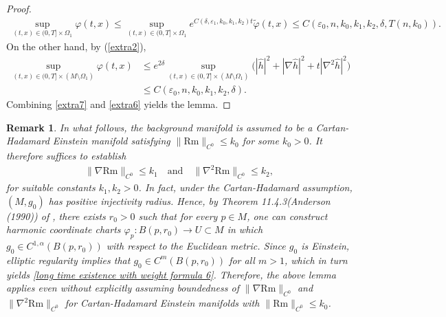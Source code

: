 \documentclass[12pt]{amsart}
\newtheorem{remark}{Remark}[section]
\begin{document}
\begin{proof}
\begin{align}\label{extra7}
    \sup_{(t, x)\in (0, T]\times \Omega_1} \varphi(t, x) \leq \sup_{(t, x)\in (0, T]\times \Omega_1}e^{C(\delta, \varepsilon_1, k_0, k_1, k_2) t}\tilde{\varphi}(t, x)\leq C(\varepsilon_0, n, k_0, k_1, k_2, \delta, T(n, k_0)).
\end{align}
On the other hand, by (\ref{extra2}), 
\begin{equation}\label{extra6}
    \begin{split}
        \sup_{(t, x)\in (0, T]\times (M\setminus\Omega_1)} \varphi(t, x)
        &\leq e^{2\delta} \sup_{(t, x)\in (0, T]\times (M\setminus \Omega_1)} \big(|\hat{h}|^2 + |\nabla \hat{h}|^2 + t|\nabla^2 \hat{h}|^2\big) \\
        &\leq C(\varepsilon_0, n, k_0, k_1, k_2, \delta).
    \end{split}
\end{equation}
Combining \eqref{extra7} and \eqref{extra6} yields the lemma.
\end{proof}

\begin{remark}\label{cartan hadamard einstein condition}
    In what follows, the background manifold is assumed to be a Cartan-Hadamard Einstein manifold satisfying $\|\mathrm{Rm}\|_{C^0} \leq k_0$ for some $k_0 > 0$. It therefore suffices to establish
    \begin{align}\label{long time existence with weight formula 6}
        \|\nabla \mathrm{Rm}\|_{C^0} \leq k_1
        \quad \text{and} \quad
        \|\nabla^2 \mathrm{Rm}\|_{C^0} \leq k_2,
    \end{align}
    for suitable constants $k_1, k_2 > 0$. In fact, under the Cartan-Hadamard assumption, $(M, g_0)$ has positive injectivity radius. Hence, by Theorem 11.4.3(Anderson (1990)) of \cite{Pp2016}, there exists $r_0 > 0$ such that for every $p \in M$, one can construct harmonic coordinate charts $\varphi_p: B(p, r_0) \to U \subset M$ in which $g_0 \in C^{1,\alpha}(B(p, r_0))$ with respect to the Euclidean metric. Since $g_0$ is Einstein, elliptic regularity implies that $g_0 \in C^m(B(p, r_0))$ for all $m > 1$, which in turn yields \eqref{long time existence with weight formula 6}. Therefore, the above lemma applies even without explicitly assuming boundedness of $\|\nabla \mathrm{Rm}\|_{C^0}$ and $\|\nabla^2 \mathrm{Rm}\|_{C^0}$ for Cartan-Hadamard Einstein manifolds with $\|\mathrm{Rm}\|_{C^0}\leq k_0$.
\end{remark}
\end{document}
